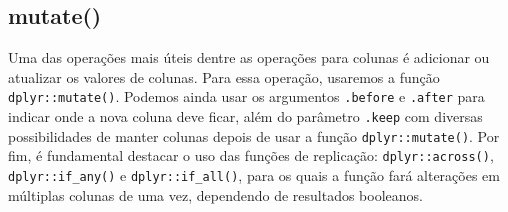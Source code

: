 \documentclass[
]{book}
\begin{document}
\hypertarget{mutate}{%
\subsection{mutate()}\label{mutate}}

Uma das operações mais úteis dentre as operações para colunas é adicionar ou atualizar os valores de colunas. Para essa operação, usaremos a função \texttt{dplyr::mutate()}. Podemos ainda usar os argumentos \texttt{.before} e \texttt{.after} para indicar onde a nova coluna deve ficar, além do parâmetro \texttt{.keep} com diversas possibilidades de manter colunas depois de usar a função \texttt{dplyr::mutate()}. Por fim, é fundamental destacar o uso das funções de replicação: \texttt{dplyr::across()}, \texttt{dplyr::if\_any()} e \texttt{dplyr::if\_all()}, para os quais a função fará alterações em múltiplas colunas de uma vez, dependendo de resultados booleanos.
\end{document}
